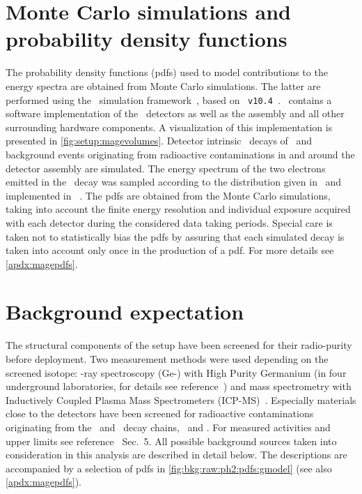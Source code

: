 \section{Monte Carlo simulations and probability density functions}

The probability density functions (pdfs) used to model contributions to the energy spectra
are obtained from Monte Carlo simulations. The latter are performed using the \mage\
simulation framework~\cite{Boswell2011}, based on
\geant~\texttt{v10.4}~\cite{Agostinelli2002, Allison2006, Allison2016}.  \mage\ contains a
software implementation of the \gerdatwo\ detectors as well as the assembly and all other
surrounding hardware components. A visualization of this implementation is presented in
\cref{fig:setup:magevolumes}. Detector intrinsic \nnbb\ decays of \gesix\ and background
events originating from radioactive contaminations in and around the detector assembly are
simulated. The energy spectrum of the two electrons emitted in the \nnbb\ decay was
sampled according to the distribution given in~\cite{Tretyak1995} and implemented in
\decayzero~\cite{Ponkratenko2000}. The pdfs are obtained from the Monte Carlo simulations,
taking into account the finite energy resolution and individual exposure acquired with
each detector during the considered data taking periods. Special care is taken not to
statistically bias the pdfs by assuring that each simulated decay is taken into account
only once in the production of a pdf. For more details see \cref{apdx:magepdfs}.

\section{Background expectation}%
\label{sec:bkg:raw:ph2:priors}

The structural components of the setup have been screened for their radio-purity before
deployment. Two measurement methods were used depending on the screened isotope: \g-ray
spectroscopy (Ge-\g) with High Purity Germanium (in four underground laboratories, for
details see reference~\cite{Ackermann2012}) and mass spectrometry with Inductively Coupled
Plasma Mass Spectrometers (ICP-MS)~\cite{Vacri2015}. Especially materials close to the
detectors have been screened for radioactive contaminations originating from the \Uh\ and
\Thh\ decay chains, \kvn\ and \Co. For measured activities and upper limits see
reference~\cite{Agostini2018a} Sec.~5. All possible background sources taken into
consideration in this analysis are described in detail below. The descriptions are
accompanied by a selection of pdfs in \cref{fig:bkg:raw:ph2:pdfs:gmodel} (see also
\cref{apdx:magepdfs}).

